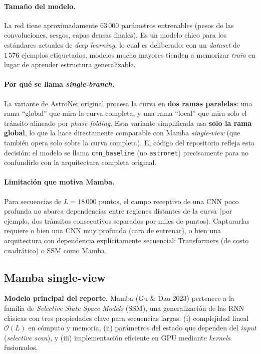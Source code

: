 \documentclass[11pt,a4paper]{article}
\begin{document}
\paragraph{Tamaño del modelo.}
La red tiene aproximadamente $63\,000$ parámetros entrenables (pesos
de las convoluciones, sesgos, capas densas finales). Es un modelo
chico para los estándares actuales de \textit{deep learning}, lo
cual es deliberado: con un \textit{dataset} de $1\,576$ ejemplos
etiquetados, modelos mucho mayores tienden a memorizar
\textit{train} en lugar de aprender estructura generalizable.

\paragraph{Por qué se llama \textit{single-branch}.}
La variante de AstroNet original procesa la curva en \textbf{dos
ramas paralelas}: una rama ``global'' que mira la curva completa, y
una rama ``local'' que mira solo el tránsito alineado por
\textit{phase-folding}. Esta variante simplificada usa
\textbf{solo la rama global}, lo que la hace directamente
comparable con Mamba \textit{single-view} (que también opera solo
sobre la curva completa). El código del repositorio refleja esta
decisión: el modelo se llama \texttt{cnn\_baseline} (no
\texttt{astronet}) precisamente para no confundirlo con la
arquitectura completa original.

\paragraph{Limitación que motiva Mamba.}
Para secuencias de $L = 18\,000$ puntos, el campo receptivo de una CNN
poco profunda no abarca dependencias entre regiones distantes de la
curva (por ejemplo, dos tránsitos consecutivos separados por miles de
puntos). Capturarlas requiere o bien una CNN muy profunda (cara de
entrenar), o bien una arquitectura con dependencia explícitamente
secuencial: Transformers (de costo cuadrático) o SSM como Mamba.

\subsection{Mamba single-view}
\label{subsec:mamba}

\textbf{Modelo principal del reporte.} Mamba (Gu \& Dao 2023) pertenece
a la familia de \textit{Selective State Space Models} (SSM), una
generalización de las RNN clásicas con tres propiedades clave para
secuencias largas: (i) complejidad lineal $\mathcal{O}(L)$ en cómputo y
memoria, (ii) parámetros del estado que dependen del \textit{input}
(\textit{selective scan}), y (iii) implementación eficiente en GPU
mediante \textit{kernels} fusionados.
\end{document}

